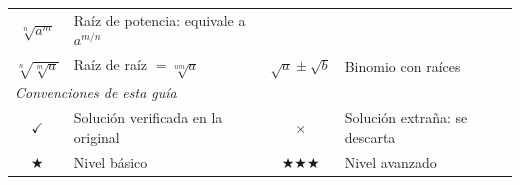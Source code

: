 \documentclass[11pt, letterpaper]{article}
\begin{document}
\begin{tcolorbox}[importantbox, title={Glosario de simbología}]
\begin{center}
\begin{tabular}{c p{4.8cm} | c p{4.8cm}}
\textcolor{zenitgold}{$\sqrt[n]{a^m}$} & \textcolor{zenitgold}{Raíz de potencia: equivale a $a^{m/n}$}\\
\textcolor{zenitgold}{$\sqrt[n]{\sqrt[m]{a}}$} & \textcolor{zenitgold}{Raíz de raíz $= \sqrt[nm]{a}$} &
\textcolor{zenitgold}{$\sqrt{a}\pm\sqrt{b}$} & \textcolor{zenitgold}{Binomio con raíces}\\[3pt]
\multicolumn{4}{l}{\textit{Convenciones de esta guía}}\\
$\checkmark$ & Solución verificada en la original &
$\times$ & Solución extraña: se descarta\\
$\bigstar$ & Nivel básico &
$\bigstar\bigstar\bigstar$ & Nivel avanzado\\
\bottomrule
\end{tabular}
\end{center}
\end{tcolorbox}

\medskip

\end{document}
